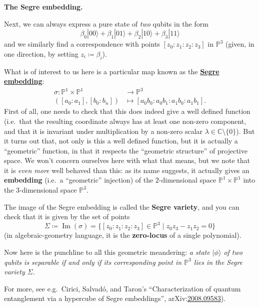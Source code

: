 \documentclass[fleqn,a4paper]{article}
\newenvironment{technical}[1]{\textbf{#1.}\par\vspace{.5\baselineskip}\everypar{\setlength{\parindent}{1.5em}}}{}
\theoremstyle{definition}
\theoremstyle{definition}
\theoremstyle{definition}
\theoremstyle{definition}
\theoremstyle{remark}
\begin{document}
\begin{technical}{The Segre embedding}
Next, we can always express a pure state of \emph{two} qubits in the form
\[
  \beta_0|00\rangle + \beta_1|01\rangle + \beta_2|10\rangle + \beta_3|11\rangle
\]
and we similarly find a correspondence with points \([z_0:z_1:z_2:z_3]\) in \(\mathbb{P}^3\) (given, in one direction, by setting \(z_i\coloneqq\beta_i\)).

What is of interest to us here is a particular map known as the \href{https://en.wikipedia.org/wiki/Segre_embedding}{\textbf{Segre embedding}}:
\[
  \begin{aligned}
    \sigma\colon\mathbb{P}^1\times\mathbb{P}^1
    &\longrightarrow\mathbb{P}^3
  \\([a_0:a_1],[b_0:b_n])
    &\longmapsto
    [a_0b_0:a_0b_1:a_1b_0:a_1b_1].
  \end{aligned}
\]
First of all, one needs to check that this does indeed give a well defined function (i.e.~that the resulting coordinate always has at least one non-zero component, and that it is invariant under multiplication by a non-zero scalar \(\lambda\in\mathbb{C}\setminus\{0\}\)).
But it turns out that, not only is this a well defined function, but it is actually a ``geometric'' function, in that it respects the ``geometric structure'' of projective space.
We won't concern ourselves here with what that means, but we note that it is \emph{even more} well behaved than this: as its name suggests, it actually gives an \textbf{embedding} (i.e.~a ``geometric'' injection) of the \(2\)-dimensional space \(\mathbb{P}^1\times\mathbb{P}^1\) into the \(3\)-dimensional space \(\mathbb{P}^3\).

The image of the Segre embedding is called the \textbf{Segre variety}, and you can check that it is given by the set of points
\[
  \Sigma
  \coloneqq \operatorname{Im}(\sigma)
  = \big\{ [z_0:z_1:z_2:z_3]\in\mathbb{P}^3 \mid z_0z_3-z_1z_2=0 \big\}
\]
(in algebraic-geometry language, it is the \textbf{zero-locus} of a single polynomial).

Now here is the punchline to all this geometric meandering: \emph{a state \(|\phi\rangle\) of two qubits is separable if and only if its corresponding point in \(\mathbb{P}^3\) lies in the Segre variety \(\Sigma\)}.

For more, see e.g.~Cirici, Salvadó, and Taron's ``Characterization of quantum entanglement via a hypercube of Segre embeddings'', arXiv:\href{https://arxiv.org/abs/2008.09583}{2008.09583}).

\end{technical}
\end{document}
